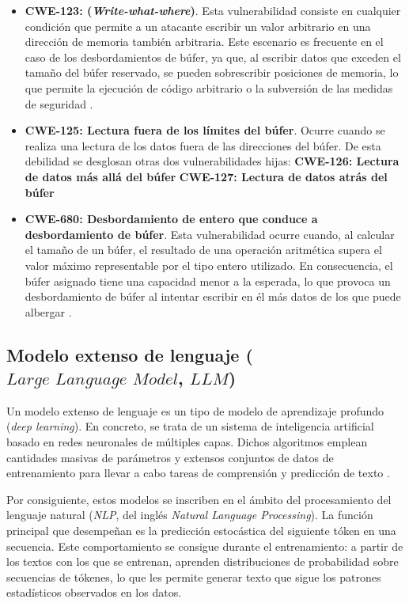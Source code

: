 \documentclass[12pt, a4paper, twoside]{article}
\begin{document}
\begin{itemize}
\item \textbf{CWE-123: (\textit{Write-what-where})}. Esta vulnerabilidad consiste en cualquier condición que permite a un atacante escribir un valor arbitrario en una dirección de memoria también arbitraria. Este escenario es frecuente en el caso de los desbordamientos de búfer, ya que, al escribir datos que exceden el tamaño del búfer reservado, se pueden sobrescribir posiciones de memoria, lo que permite la ejecución de código arbitrario o la subversión de las medidas de seguridad \cite{mitre-cwe-123}.

\item \textbf{CWE-125: Lectura fuera de los límites del búfer}. Ocurre cuando se realiza una lectura de los datos fuera de las direcciones del búfer. De esta debilidad se desglosan otras dos vulnerabilidades hijas:
\subitem \textbf{CWE-126: Lectura de datos más allá del búfer}
\subitem \textbf{CWE-127: Lectura de datos atrás del búfer}

\item \textbf{CWE-680: Desbordamiento de entero que conduce a desbordamiento de búfer}. Esta vulnerabilidad ocurre cuando, al calcular el tamaño de un búfer, el resultado de una operación aritmética supera el valor máximo representable por el tipo entero utilizado. En consecuencia, el búfer asignado tiene una capacidad menor a la esperada, lo que provoca un desbordamiento de búfer al intentar escribir en él más datos de los que puede albergar \cite{mitre-cwe-680}. 
\end{itemize}


\subsection{Modelo extenso de lenguaje ($\textit{Large Language Model}$, $\textit{LLM}$)}
Un modelo extenso de lenguaje es un tipo de modelo de aprendizaje profundo (\textit{deep learning}). En concreto, se trata de un sistema de inteligencia artificial basado en redes neuronales de múltiples capas. Dichos algoritmos emplean cantidades masivas de parámetros y extensos conjuntos de datos de entrenamiento para llevar a cabo tareas de comprensión y predicción de texto \cite{michael-britannica-2026}.

Por consiguiente, estos modelos se inscriben en el ámbito del procesamiento del lenguaje natural (\textit{NLP}, del inglés \textit{Natural Language Processing}). La función principal que desempeñan es la predicción estocástica del siguiente tóken en una secuencia. Este comportamiento se consigue durante el entrenamiento: a partir de los textos con los que se entrenan, aprenden distribuciones de probabilidad sobre secuencias de tókenes, lo que les permite generar texto que sigue los patrones estadísticos observados en los datos. \cite{stryker-2025}
\end{document}
